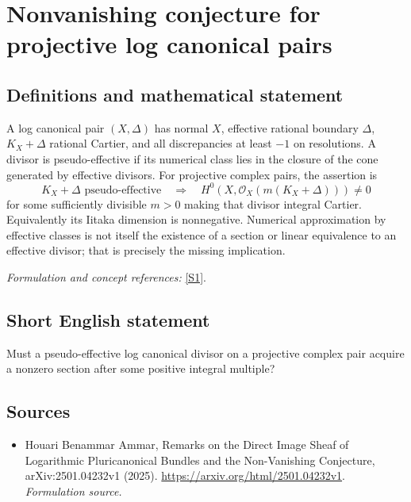 \documentclass[11pt]{article}
\begin{document}
\section*{\texorpdfstring{Nonvanishing conjecture for projective log canonical pairs}{Nonvanishing conjecture for projective log canonical pairs}}\label{statement}
\subsection{Definitions and mathematical statement}
A log canonical pair $(X,\Delta)$ has normal $X$, effective rational boundary $\Delta$, $K_X+\Delta$ rational Cartier, and all discrepancies at least $-1$ on resolutions. A divisor is pseudo-effective if its numerical class lies in the closure of the cone generated by effective divisors. For projective complex pairs, the assertion is
\[
 K_X+\Delta\text{ pseudo-effective}
 \quad\Longrightarrow\quad
 H^0(X,\mathcal O_X(m(K_X+\Delta)))\ne0
\]
for some sufficiently divisible $m>0$ making that divisor integral Cartier. Equivalently its Iitaka dimension is nonnegative. Numerical approximation by effective classes is not itself the existence of a section or linear equivalence to an effective divisor; that is precisely the missing implication.
\par\smallskip\textit{Formulation and concept references:} \href{https://arxiv.org/html/2501.04232v1}{[S1]}.

\subsection{Short English statement}
Must a pseudo-effective log canonical divisor on a projective complex pair acquire a nonzero section after some positive integral multiple?
\subsection{Sources}
\begin{itemize}
\item[S1]Houari Benammar Ammar, Remarks on the Direct Image Sheaf of Logarithmic Pluricanonical Bundles and the Non-Vanishing Conjecture, arXiv:2501.04232v1 (2025).
\url{https://arxiv.org/html/2501.04232v1}.
\textit{Formulation source.}
\end{itemize}
\end{document}
